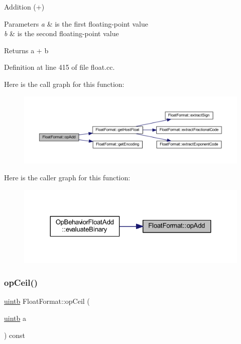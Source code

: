 Addition (+) 


\begin{DoxyParams}{Parameters}
{\em a} & is the first floating-\/point value \\
\hline
{\em b} & is the second floating-\/point value \\
\hline
\end{DoxyParams}
\begin{DoxyReturn}{Returns}
a + b 
\end{DoxyReturn}


Definition at line 415 of file float.\+cc.

Here is the call graph for this function\+:
\nopagebreak
\begin{figure}[H]
\begin{center}
\leavevmode
\includegraphics[width=350pt]{class_float_format_ad342814d842cb20b16dbe4fc9af59e1e_cgraph}
\end{center}
\end{figure}
Here is the caller graph for this function\+:
\nopagebreak
\begin{figure}[H]
\begin{center}
\leavevmode
\includegraphics[width=324pt]{class_float_format_ad342814d842cb20b16dbe4fc9af59e1e_icgraph}
\end{center}
\end{figure}
\mbox{\label{class_float_format_a997db68ddb2ee0835f3ffde93f4c4958}} 
\subsubsection{\texorpdfstring{opCeil()}{opCeil()}}
{\footnotesize\ttfamily \mbox{\hyperlink{types_8h_a2db313c5d32a12b01d26ac9b3bca178f}{uintb}} Float\+Format\+::op\+Ceil (\begin{DoxyParamCaption}\item[{\mbox{\hyperlink{types_8h_a2db313c5d32a12b01d26ac9b3bca178f}{uintb}}}]{a }\end{DoxyParamCaption}) const}



